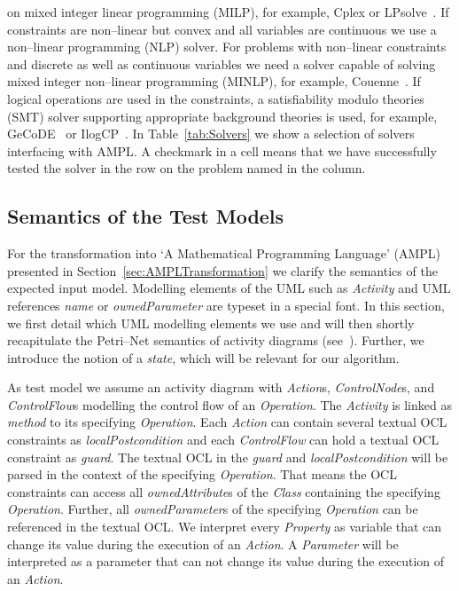 \documentclass[runningheads,a4paper]{llncs}%
\newcommand{\UMLType}[1]{\textsf{\textit{#1}}} %
\newcommand{\UMLReference}[1]{\textsf{\textit{#1}}} %
\begin{document}
on mixed integer linear programming (MILP), for example, Cplex or
LPsolve~\cite{lpsolve}. If constraints are non--linear but convex and all
variables are continuous we use a non--linear programming (NLP) solver. For
problems with non--linear constraints and discrete as well as continuous
variables we need a solver capable of solving mixed integer non--linear
programming (MINLP), for example, Couenne~\cite{Belotti09couenne}. If logical
operations are used in the constraints, a satisfiability modulo theories (SMT)
solver supporting appropriate background theories is used, for example,
GeCoDE~\cite{gecode} or IlogCP~\cite{ilogcp}. In Table~\ref{tab:Solvers} we show
a selection of solvers interfacing with AMPL. A checkmark in a cell means that
we have successfully tested the solver in the row on the problem named in the
column.%
%
\subsection{Semantics of the Test Models}%
\label{sec:TestModel}%
For the transformation into `A Mathematical Programming Language' (AMPL)
presented in Section~\ref{sec:AMPLTransformation} we clarify the semantics of
the expected input model. Modelling elements of the UML such as
\UMLType{Activity} and UML references \UMLReference{name} or
\UMLReference{ownedParameter} are typeset in a special font. In this section, we
first detail which UML modelling elements we use and will then shortly
recapitulate the Petri--Net semantics of activity diagrams
(see~\cite{UML23Superstructure}). Further, we introduce the notion of a
\emph{state}, which will be relevant for our algorithm.

As test model we assume an activity diagram with \UMLType{Action}s,
\UMLType{ControlNode}s, and \UMLType{ControlFlow}s modelling the control flow of
an \UMLType{Operation}. The \UMLType{Activity} is linked as
\UMLReference{method} to its specifying \UMLType{Operation}. Each
\UMLType{Action} can contain several textual OCL constraints as
\UMLReference{localPostcondition} and each \UMLType{ControlFlow} can hold a
textual OCL constraint as \UMLReference{guard}. The textual OCL in the
\UMLReference{guard} and \UMLReference{localPostcondition} will be parsed in the
context of the specifying \UMLType{Operation}. That means the OCL constraints
can access all \UMLReference{ownedAttribute}s of the \UMLType{Class} containing
the specifying \UMLType{Operation}. Further, all \UMLReference{ownedParameter}s
of the specifying \UMLType{Operation} can be referenced in the textual OCL. We
interpret every \UMLType{Property} as variable that can change its value during
the execution of an \UMLType{Action}. A \UMLType{Parameter} will be interpreted
as a parameter that can not change its value during the execution of an
\UMLType{Action}.
\end{document}
